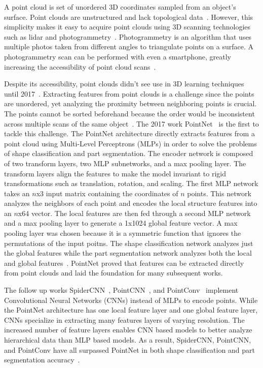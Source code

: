 A point cloud is set of unordered 3D coordinates sampled from an object's surface. Point clouds are unstructured and lack topological data~\cite{Xiao2020}. However, this simplicity makes it easy to acquire point clouds using 3D scanning technologies such as lidar and photogrammetry~\cite{Leberl2010}. Photogrammetry is an algorithm that uses multiple photos taken from different angles to triangulate points on a surface. A photogrammetry scan can be performed with even a smartphone, greatly increasing the accessibility of point cloud scans~\cite{Micheletti2015}.

Despite its accessibility, point clouds didn't see use in 3D learning techniques until 2017~\cite{Xiao2020}. Extracting features from point clouds is a challenge since the points are unordered, yet analyzing the proximity between neighboring points is crucial. The points cannot be sorted beforehand because the order would be inconsistent across multiple scans of the same object~\cite{Qi2017}. The 2017 work PointNet~\cite{Qi2017} is the first to tackle this challenge. The PointNet architecture directly extracts features from a point cloud using Multi-Level Perceptrons (MLPs) in order to solve the problems of shape classification and part segmentation. The encoder network is composed of two transform layers, two MLP subnetworks, and a max pooling layer. The transform layers align the features to make the model invariant to rigid transformations such as translation, rotation, and scaling. The first MLP network takes an $n$x3 input matrix containing the coordinates of $n$ points. This network analyzes the neighbors of each point and encodes the local structure features into an $n$x64 vector. The local features are then fed through a second MLP network and a max pooling layer to generate a 1x1024 global feature vector. A max pooling layer was chosen because it is a symmetric function that ignores the permutations of the input poitns. The shape classification network analyzes just the global features while the part segmentation network analyzes both the local and global features~\cite{Qi2017}. PointNet proved that features can be extracted directly from point clouds and laid the foundation for many subsequent works.

The follow up works SpiderCNN~\cite{Xu2018}, PointCNN~\cite{Li2018}, and PointConv~\cite{Wu2019} implement Convolutional Neural Networks (CNNs) instead of MLPs to encode points. While the PointNet architecture has one local feature layer and one global feature layer, CNNs specialize in extracting many features layers of varying resolution. The increased number of feature layers enables CNN based models to better analyze hierarchical data than MLP based models. As a result, SpiderCNN, PointCNN, and PointConv have all surpassed PointNet in both shape classification and part segmentation accuracy~\cite{Wu2019}.

